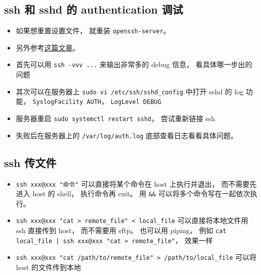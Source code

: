\subsection{ssh 和 sshd 的 authentication 调试}
\begin{itemize}
\item 如果想重置设置文件， 就重装 \verb|openssh-server|。
\item 另外参考\href{https://medium.com/ci-cd-devops/ssh-receive-packet-type-51-154288e46609}{这篇文章}。
\item 首先可以用 \verb|ssh -vvv ...| 来输出非常多的 debug 信息， 看具体哪一步出的问题
\item 其次可以在服务器上 \verb|sudo vi /etc/ssh/sshd_config| 中打开 sshd 的 log 功能， \verb|SyslogFacility AUTH|， \verb|LogLevel DEBUG|
\item 服务器重启 \verb`sudo systemctl restart sshd`， 尝试重新链接 ssh
\item 失败后在服务器上的 \verb|/var/log/auth.log| 底部查看日志看看具体问题。
\end{itemize}

\subsection{ssh 传文件}
\begin{itemize}
\item \verb`ssh xxx@xxx "命令"` 可以直接将某个命令在 host 上执行并退出， 而不需要先进入 host 的 shell， 执行命令再 exit。 用 \verb`&&` 可以将多个命令写在一起依次执行。
\item \verb`ssh xxx@xxx "cat > remote_file" < local_file` 可以直接将本地文件用 ssh 直接传到 host， 而不需要用 sftp。 也可以用 piping， 例如 \verb`cat local_file | ssh xxx@xxx "cat > remote_file"`， 效果一样
\item \verb`ssh xxx@xxx "cat /path/to/remote_file" > /path/to/local_file` 可以将 host 的文件传到本地
\end{itemize}

